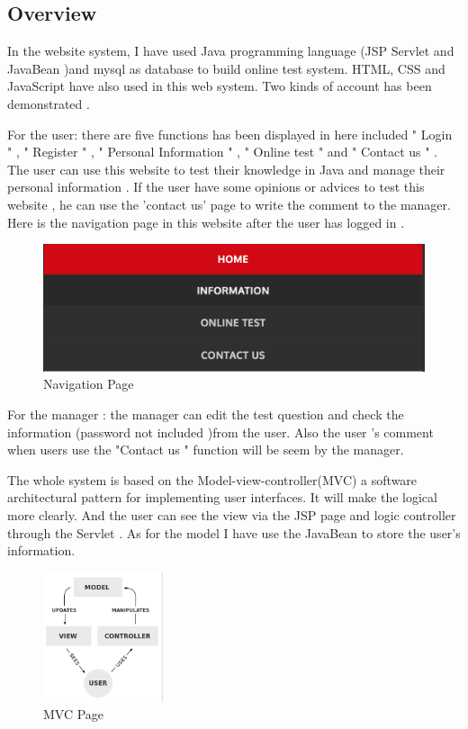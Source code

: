\documentclass[12pt]{article}
\begin{document}
\subsection{Overview}
	In the website system, I have used Java programming language  (JSP Servlet and JavaBean )and mysql as database to build online test system.  HTML, CSS and JavaScript have also used in this web system.  Two kinds of account has been demonstrated . 
	
	For the user: there are five functions has been displayed in here included " Login " , " Register " , " Personal Information " , " Online test " and " Contact us " . The user can use this website to test their knowledge in Java and manage their personal information . If the user have some opinions or advices to test this website , he can use the 'contact us' page to write the comment to the manager.   Here is the navigation page in this website after the user has logged in .
	\begin{figure}[H]
	\centering
	\includegraphics[width=13cm]{images/Navigation.jpg}
	\caption[Navigation page]{Navigation Page}
	\label{fig:Navigation Page}
\end{figure}
	For the manager : the manager can edit the test question and check the information (password not included )from the user. Also the user 's comment when users use the "Contact us " function will be seem by the manager.
	
	
	
	
	The whole system is based on the Model-view-controller(MVC) a software architectural pattern for implementing user interfaces.  It will make the logical more clearly. And the user can see the view via the JSP page and logic controller through the Servlet . As for the model I have use the JavaBean to store the user's information.
\begin{figure}[H]
	\centering
	\includegraphics[height=1.5in]{images/MVC.jpg}

	\caption[MVC page]{MVC Page}
	\label{fig:MVC Page}
\end{figure}
\end{document}
